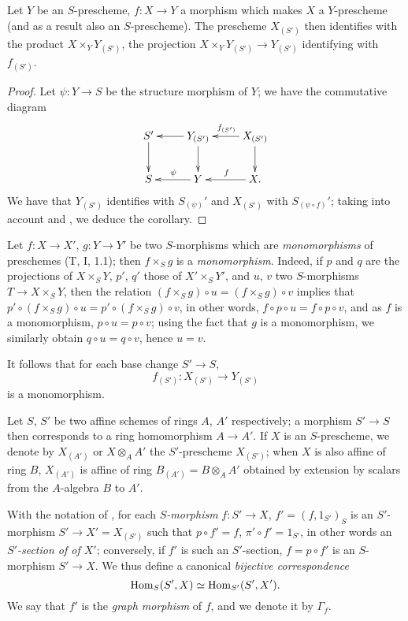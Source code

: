 \begin{cor}[3.3.11]
\label{1.3.3.11}
Let $Y$ be an $S$-prescheme, $f:X\to Y$ a morphism which makes $X$ a
$Y$-prescheme (and as a result also an $S$-prescheme). The prescheme $X_{(S')}$
then identifies with the product $X\times_Y Y_{(S')}$, the projection
$X\times_Y Y_{(S')}\to Y_{(S')}$ identifying with $f_{(S')}$.
\end{cor}

\begin{proof}
\label{proof-1.3.3.11}
Let $\psi:Y\to S$ be the structure morphism of $Y$; we have the commutative
diagram
\[
  \xymatrix{
    S'\ar[d] &
    Y_{(S')}\ar[l]\ar[d] &
    X_{(S')}\ar[l]_{f_{(S')}}\ar[d]\\
    S &
    Y\ar[l]_\psi &
    X\ar[l]_f.
  }
\]
We have that $Y_{(S')}$ identifies with $S_{(\psi)}'$ and $X_{(S')}$ with
$S_{(\psi\circ f)}'$; taking into account  and
, we deduce the corollary.
\end{proof}

\begin{env}[3.3.12]
\label{1.3.3.12}
Let $f:X\to X'$, $g:Y\to Y'$ be two $S$-morphisms which are \emph{monomorphisms}
of preschemes (T, I, 1.1); then $f\times_S g$ is a \emph{monomorphism}. Indeed,
if $p$ and $q$ are the projections of $X\times_S Y$, $p'$, $q'$ those of
$X'\times_S Y'$, and $u$, $v$ two $S$-morphisms $T\to X\times_S Y$, then the
relation $(f\times_S g)\circ u=(f\times_S g)\circ v$ implies that
$p'\circ(f\times_S g)\circ u=p'\circ(f\times_S g)\circ v$, in other words,
$f\circ p\circ u=f\circ p\circ v$, and as $f$ is a monomorphism,
$p\circ u=p\circ v$; using the fact that $g$ is a monomorphism, we similarly
obtain $q\circ u=q\circ v$, hence $u=v$.

It follows that for each base change $S'\to S$,
\[
  f_{(S')}:X_{(S')}\to Y_{(S')}
\]
is a monomorphism.
\end{env}

\begin{env}[3.3.13]
\label{1.3.3.13}
Let $S$, $S'$ be two affine schemes of rings $A$, $A'$ respectively; a morphism
$S'\to S$ then corresponds to a ring homomorphism $A\to A'$. If $X$ is an
$S$-prescheme, we denote by $X_{(A')}$ or $X\otimes_A A'$ the $S'$-prescheme
$X_{(S')}$; when $X$ is also affine of ring $B$, $X_{(A')}$ is affine of ring
$B_{(A')}=B\otimes_A A'$ obtained by extension by scalars from the $A$-algebra
$B$ to $A'$.
\end{env}

\begin{env}[3.3.14]
\label{1.3.3.14}
With the notation of , for each \emph{$S$-morphism}
$f:S'\to X$, $f'=(f,1_{S'})_S$ is an $S'$-morphism $S'\to X'=X_{(S')}$ such that
$p\circ f'=f$, $\pi'\circ f'=1_{S'}$, in other words an \emph{$S'$-section of
of $X'$}; conversely, if $f'$ is such an $S'$-section, $f=p\circ f'$ is an
$S$-morphism $S'\to X$. We thus define a canonical
\emph{bijective correspondence}
\[
  {\mathop{\mathrm{Hom}}\nolimits}_S(S',X)\simeq{\mathop{\mathrm{Hom}}\nolimits}_{S'}(S',X').
\]
We say that $f'$ is the \emph{graph morphism} of $f$, and we denote it by
$\Gamma_f$.
\end{env}

